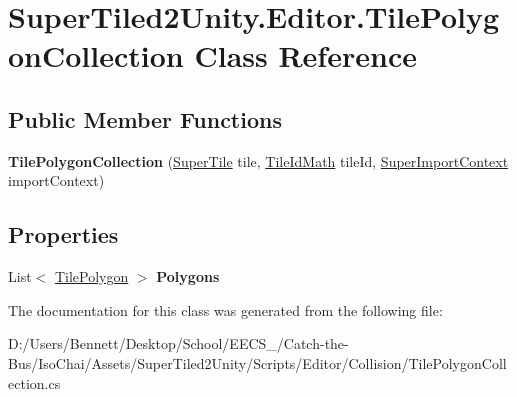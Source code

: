 \hypertarget{class_super_tiled2_unity_1_1_editor_1_1_tile_polygon_collection}{}\section{Super\+Tiled2\+Unity.\+Editor.\+Tile\+Polygon\+Collection Class Reference}
\label{class_super_tiled2_unity_1_1_editor_1_1_tile_polygon_collection}
\subsection*{Public Member Functions}
\begin{DoxyCompactItemize}
\item 
\mbox{\label{class_super_tiled2_unity_1_1_editor_1_1_tile_polygon_collection_acaa32efc4406ec9377479e286debc228}} 
{\bfseries Tile\+Polygon\+Collection} (\mbox{\hyperlink{class_super_tiled2_unity_1_1_super_tile}{Super\+Tile}} tile, \mbox{\hyperlink{struct_super_tiled2_unity_1_1_editor_1_1_tile_id_math}{Tile\+Id\+Math}} tile\+Id, \mbox{\hyperlink{class_super_tiled2_unity_1_1_editor_1_1_super_import_context}{Super\+Import\+Context}} import\+Context)
\end{DoxyCompactItemize}
\subsection*{Properties}
\begin{DoxyCompactItemize}
\item 
\mbox{\label{class_super_tiled2_unity_1_1_editor_1_1_tile_polygon_collection_a11908cd25281020424f1f9ac98ff435d}} 
List$<$ \mbox{\hyperlink{class_super_tiled2_unity_1_1_editor_1_1_tile_polygon}{Tile\+Polygon}} $>$ {\bfseries Polygons}
\end{DoxyCompactItemize}


The documentation for this class was generated from the following file\+:\begin{DoxyCompactItemize}
\item 
D\+:/\+Users/\+Bennett/\+Desktop/\+School/\+E\+E\+C\+S\+\_/\+Catch-\/the-\/\+Bus/\+Iso\+Chai/\+Assets/\+Super\+Tiled2\+Unity/\+Scripts/\+Editor/\+Collision/Tile\+Polygon\+Collection.\+cs\end{DoxyCompactItemize}
